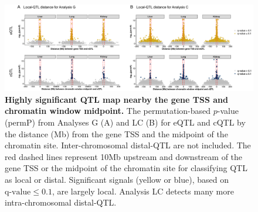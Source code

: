 \documentclass[9pt,twocolumn,twoside]{gsajnl}
\begin{document}
%
%

\begin{figure}[hp]
\renewcommand{\familydefault}{\sfdefault}\normalfont
\centering
\includegraphics[width=\textwidth]{figs/qtl_distance_all.pdf}
\caption{\textbf{Highly significant QTL map nearby the gene TSS and chromatin window midpoint.} The permutation-based $p$-value (permP) from Analyses G (A) and LC (B) for eQTL and cQTL by the distance (Mb) from the gene TSS and the midpoint of the chromatin site. Inter-chromosomal distal-QTL are not included. The red dashed lines represent 10Mb upstream and downstream of the gene TSS or the midpoint of the chromatin site for classifying QTL as local or distal. Significant signals (yellow or blue), based on $\text{q-value} \le 0.1$, are largely local. Analysis LC detects many more intra-chromosomal distal-QTL.
\label{fig:dist_all}}
\end{figure}
\end{document}
